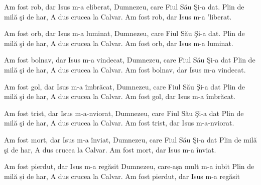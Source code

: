 
\beginverse
Am fost rob, dar Isus m-a eliberat,
Dumnezeu, care Fiul Său Şi-a dat.
Plin de milă şi de har,
A dus crucea la Calvar.
Am fost rob, dar Isus m-a 'liberat.
\endverse

\beginverse
Am fost orb, dar Isus m-a luminat,
Dumnezeu, care Fiul Său Şi-a dat.
Plin de milă şi de har,
A dus crucea la Calvar.
Am fost orb, dar Isus m-a luminat.
\endverse

\beginverse
Am fost bolnav, dar Isus m-a vindecat,
Dumnezeu, care Fiul Său Şi-a dat
Plin de milă şi de har,
A dus crucea la Calvar.
Am fost bolnav, dar Isus m-a vindecat.
\endverse

\beginverse
Am fost gol, dar Isus m-a îmbrăcat,
Dumnezeu, care Fiul Său Şi-a dat
Plin de milă şi de har,
A dus crucea la Calvar.
Am fost gol, dar Isus m-a îmbrăcat.
\endverse

\beginverse
Am fost trist, dar Isus m-a-nviorat,
Dumnezeu, care Fiul Său Şi-a dat
Plin de milă şi de har,
A dus crucea la Calvar.
Am fost trist, dar Isus m-a-nviorat.
\endverse

\beginverse
Am fost mort, dar Isus m-a înviat,
Dumnezeu, care Fiul Său Şi-a dat
Plin de milă şi de har,
A dus crucea la Calvar.
Am fost mort, dar Isus m-a înviat.
\endverse

\beginverse
Am fost pierdut, dar Isus m-a regăsit
Dumnezeu, care-așa mult m-a iubit
Plin de milă și de har,
A dus crucea la Calvar.
Am fost pierdut, dar Isus m-a regăsit
\endverse

\endsong